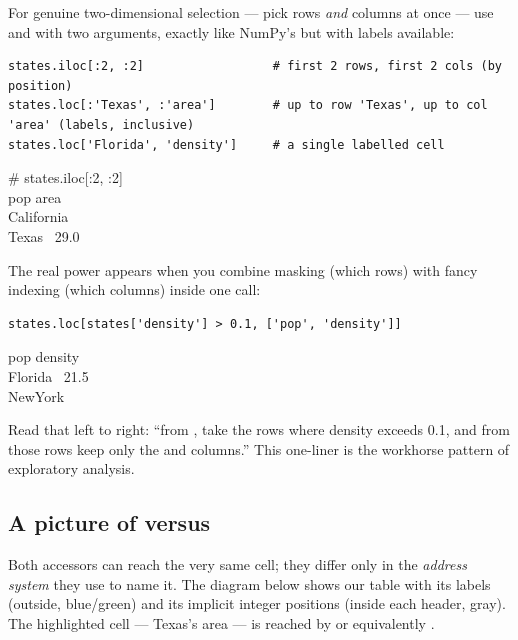\documentclass[11pt]{article}
\begin{document}
For genuine two-dimensional selection --- pick rows \emph{and} columns at once --- use  and  with two arguments, exactly like NumPy's  but with labels available:

\begin{lstlisting}
states.iloc[:2, :2]                  # first 2 rows, first 2 cols (by position)
states.loc[:'Texas', :'area']        # up to row 'Texas', up to col 'area' (labels, inclusive)
states.loc['Florida', 'density']     # a single labelled cell
\end{lstlisting}

\begin{outbox}
\# states.iloc[:2, :2] \\
\quad\quad\quad\quad pop \quad area \\
California   \\
Texas \quad\quad\;\, 29.0 
\end{outbox}

The real power appears when you combine masking (which rows) with fancy indexing (which columns) inside one  call:

\begin{lstlisting}
states.loc[states['density'] > 0.1, ['pop', 'density']]
\end{lstlisting}

\begin{outbox}
\quad\quad\quad\quad pop \quad density \\
Florida \quad\, 21.5  \\
NewYork  
\end{outbox}

Read that left to right: ``from , take the rows where density exceeds 0.1, and from those rows keep only the  and  columns.'' This one-liner is the workhorse pattern of exploratory analysis.

\subsection{A picture of \texorpdfstring{}{loc} versus \texorpdfstring{}{iloc}}

Both accessors can reach the very same cell; they differ only in the \emph{address system} they use to name it. The diagram below shows our  table with its labels (outside, blue/green) and its implicit integer positions (inside each header, gray). The highlighted cell --- Texas's area --- is reached by  or equivalently .
\end{document}
